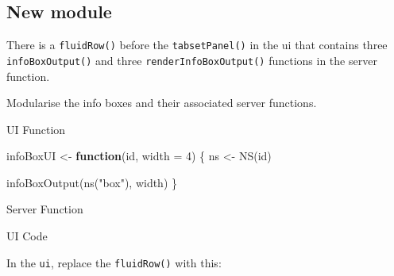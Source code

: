 \documentclass[
  oneside]{book}
\newenvironment{Shaded}{\begin{snugshade}}{\end{snugshade}}
\newcommand{\AttributeTok}[1]{\textcolor[rgb]{0.77,0.63,0.00}{#1}}
\newcommand{\ControlFlowTok}[1]{\textcolor[rgb]{0.13,0.29,0.53}{\textbf{#1}}}
\newcommand{\DecValTok}[1]{\textcolor[rgb]{0.00,0.00,0.81}{#1}}
\newcommand{\FunctionTok}[1]{\textcolor[rgb]{0.00,0.00,0.00}{#1}}
\newcommand{\NormalTok}[1]{#1}
\newcommand{\OtherTok}[1]{\textcolor[rgb]{0.56,0.35,0.01}{#1}}
\newcommand{\SpecialCharTok}[1]{\textcolor[rgb]{0.00,0.00,0.00}{#1}}
\newcommand{\StringTok}[1]{\textcolor[rgb]{0.31,0.60,0.02}{#1}}
\begin{document}
\hypertarget{new-module}{%
\subsection{New module}\label{new-module}}

There is a \texttt{fluidRow}\texttt{()} before the \texttt{tabsetPanel}\texttt{()} in the ui that contains three \texttt{infoBoxOutput}\texttt{()} and three \texttt{renderInfoBoxOutput}\texttt{()} functions in the server function.

Modularise the info boxes and their associated server functions.

UI Function

\begin{Shaded}
\begin{Highlighting}[]
\NormalTok{infoBoxUI }\OtherTok{\textless{}{-}} \ControlFlowTok{function}\NormalTok{(id, }\AttributeTok{width =} \DecValTok{4}\NormalTok{) \{}
\NormalTok{    ns }\OtherTok{\textless{}{-}} \FunctionTok{NS}\NormalTok{(id)}

    \FunctionTok{infoBoxOutput}\NormalTok{(}\FunctionTok{ns}\NormalTok{(}\StringTok{"box"}\NormalTok{), width)}
\NormalTok{\}}
\end{Highlighting}
\end{Shaded}

Server Function

\begin{Shaded}
\end{Shaded}

UI Code

In the \texttt{ui}, replace the \texttt{fluidRow}\texttt{()} with this:
\end{document}

